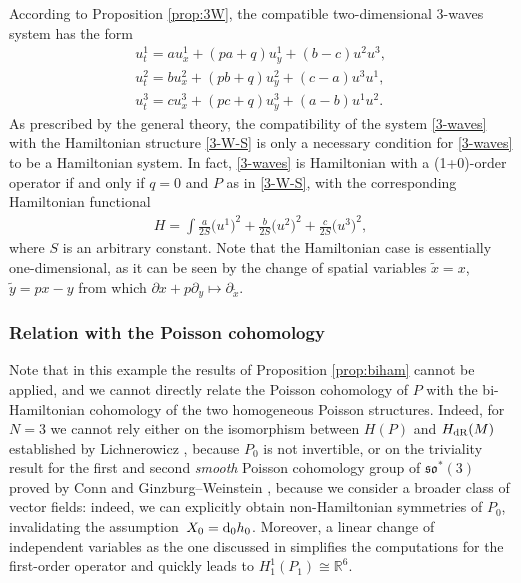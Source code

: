 \documentclass[pdftex]{sigma}
\numberwithin{equation}{section}
\begin{document}
According to Proposition \ref{prop:3W}, the compatible two-dimensional 3-waves system has the form
\begin{gather}
u^1_t=au^1_x+(pa+q)u^1_y+(b-c)u^2u^3,\nonumber\\
u^2_t=bu^2_x+(pb+q)u^2_y+(c-a)u^3u^1,\nonumber\\
u^3_t=cu^3_x+(pc+q)u^3_y+(a-b)u^1u^2.\label{eq:3W-sol}
\end{gather}
As prescribed by the general theory, the compatibility of the system \eqref{3-waves} with the Hamiltonian structure \eqref{3-W-S} is only a necessary condition for \eqref{3-waves} to be a Hamiltonian system. In fact, \eqref{3-waves} is Hamiltonian with a (1+0)-order operator if and only if $q=0$
and $P$ as in \eqref{3-W-S}, with the corresponding Hamiltonian functional
\begin{gather*}%
H=\int \frac{a}{2S}{\big(u^1\big)}^2+\frac{b}{2S}{\big(u^2\big)}^2+\frac{c}{2S}{\big(u^3\big)}^2,
\end{gather*}
where $S$ is an arbitrary constant. Note that the Hamiltonian case is essentially one-dimensional, as it can be seen by the change of spatial variables $\tilde{x}=x$, $\tilde{y}=p x -y$ from which $\partial x+p\partial_y\mapsto\partial_{\tilde{x}}$.

\subsubsection{Relation with the Poisson cohomology}
Note that in this example the results of Proposition \ref{prop:biham} cannot be applied, and we cannot directly relate the Poisson cohomology of $P$ with the bi-Hamiltonian cohomology of the two homogeneous Poisson structures. Indeed, for $N=3$ we cannot rely either on the isomorphism between $H(P)$ and $H_{\rm dR}(M)$ established by Lichnerowicz \cite{lichnerowicz1977varietes}, because $P_0$ is not invertible, or on the triviality result for the first and second \emph{smooth} Poisson cohomology group of $\mathfrak{so}^*(3)$ proved by Conn \cite{conn85} and Ginzburg--Weinstein \cite{gw92}, because we consider a broader class of vector fields: indeed, we can explicitly obtain non-Hamiltonian symmetries of $P_0$, invalidating the assumption~${X_0={\rm d}_0h_0}$. Moreover, a linear change of independent variables as the one discussed in \cite{ccs17} simplifies the computations for the first-order operator and quickly leads to $H^1_1(P_1)\cong\mathbb{R}^6$.
\end{document}
